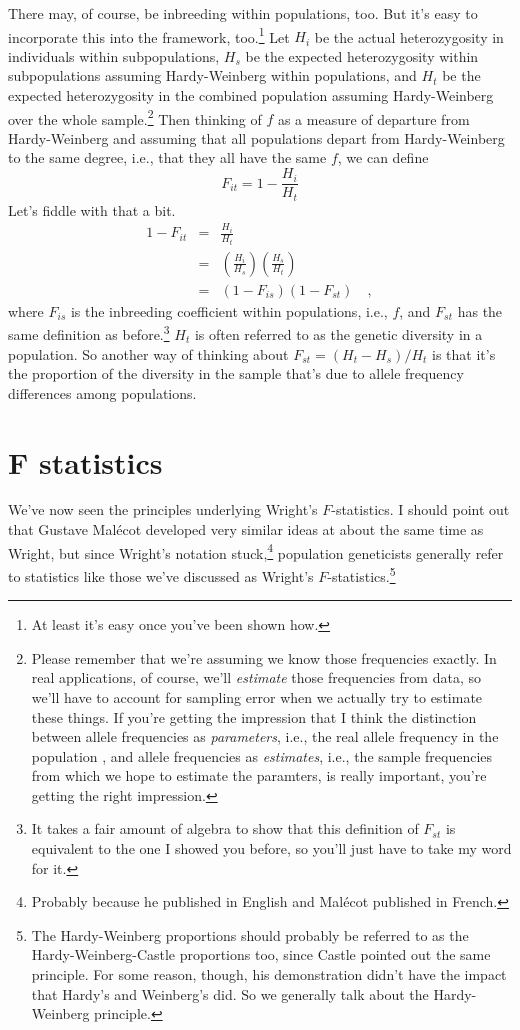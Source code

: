 \documentclass[12pt]{article}
\begin{document}
There may, of course, be inbreeding within populations, too. But it's
easy to incorporate this into the framework, too.\footnote{At least
  it's easy once you've been shown how.} Let $H_i$ be the actual
heterozygosity in individuals within subpopulations, $H_s$ be the
expected heterozygosity within subpopulations assuming Hardy-Weinberg
within populations, and $H_t$ be the expected heterozygosity in the
combined population assuming Hardy-Weinberg over the whole
sample.\footnote{Please remember that we're assuming we know those
  frequencies exactly. In real applications, of course, we'll {\it
    estimate\/} those frequencies from data, so we'll have to account
  for sampling error when we actually try to estimate these things. If
  you're getting the impression that I think the distinction between
  allele frequencies as {\it parameters\/}, i.e., the real allele
  frequency in the population , and allele frequencies as {\it
    estimates\/}, i.e., the sample frequencies from which we hope to
  estimate the paramters, is really important, you're getting the
  right impression.}  Then thinking of $f$ as a measure of departure
from Hardy-Weinberg and assuming that all populations depart from
Hardy-Weinberg to the same degree, i.e., that they all have the same
$f$, we can define
\[
F_{it} = 1 - \frac{H_i}{H_t}
\]
Let's fiddle with that a bit.
\begin{eqnarray*}
1 - F_{it} &=& \frac{H_i}{H_t} \\
           &=& \left(\frac{H_i}{H_s}\right)\left(\frac{H_s}{H_t}\right) \\
           &=& (1 - F_{is})(1 - F_{st}) \quad ,
\end{eqnarray*}
where $F_{is}$ is the inbreeding coefficient within populations, i.e.,
$f$, and $F_{st}$ has the same definition as before.\footnote{It takes
  a fair amount of algebra to show that this definition of $F_{st}$ is
  equivalent to the one I showed you before, so you'll just have to
  take my word for it.} $H_t$ is often referred to as the genetic
diversity in a population. So another way of thinking about $F_{st} =
(H_t - H_s)/H_t$ is that it's the proportion of the diversity in the
sample that's due to allele frequency differences among populations.

\section*{F statistics}

We've now seen the principles underlying Wright's $F$-statistics. I
should point out that Gustave Mal{\'e}cot developed very similar ideas
at about the same time as Wright, but since Wright's notation
stuck,\footnote{Probably because he published in English and
  Mal{\'e}cot published in French.} population geneticists generally
refer to statistics like those we've discussed as Wright's
$F$-statistics.\footnote{The Hardy-Weinberg proportions should
  probably be referred to as the Hardy-Weinberg-Castle proportions
  too, since Castle pointed out the same principle. For some reason,
  though, his demonstration didn't have the impact that Hardy's and
  Weinberg's did. So we generally talk about the Hardy-Weinberg
  principle.}
\end{document}
